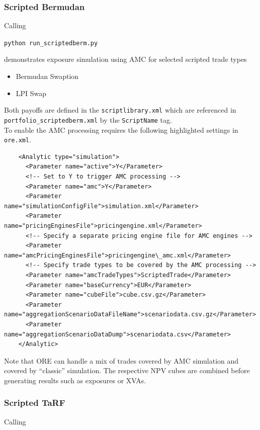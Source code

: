 \subsubsection{Scripted Bermudan}

Calling

\medskip
\centerline {\tt python run\_scriptedberm.py}

\medskip
demonstrates exposure simulation using AMC for selected scripted trade types
\begin{itemize}
\item Bermudan Swaption
\item LPI Swap
\end{itemize}
Both payoffs are defined in the {\tt scriptlibrary.xml} which are referenced in {\tt portfolio\_scriptedberm.xml}
by the {\tt ScriptName} tag. \\

To enable the AMC processing requires the following highlighted settings in {\tt ore.xml}.

\begin{verbatim}
    <Analytic type="simulation">
      <Parameter name="active">Y</Parameter>
      <!-- Set to Y to trigger AMC processing -->
      <Parameter name="amc">Y</Parameter>
      <Parameter name="simulationConfigFile">simulation.xml</Parameter>
      <Parameter name="pricingEnginesFile">pricingengine.xml</Parameter>
      <!-- Specify a separate pricing engine file for AMC engines -->
      <Parameter name="amcPricingEnginesFile">pricingengine\_amc.xml</Parameter>
      <!-- Specify trade types to be covered by the AMC processing -->
      <Parameter name="amcTradeTypes">ScriptedTrade</Parameter>
      <Parameter name="baseCurrency">EUR</Parameter>
      <Parameter name="cubeFile">cube.csv.gz</Parameter>
      <Parameter name="aggregationScenarioDataFileName">scenariodata.csv.gz</Parameter>
      <Parameter name="aggregationScenarioDataDump">scenariodata.csv</Parameter>
    </Analytic>
\end{verbatim}

Note that ORE can handle a mix of trades covered by AMC simulation and covered by ``classic'' simulation.
The respective NPV cubes are combined before generating results such as exposures or XVAs.

\subsubsection{Scripted TaRF}

Calling

